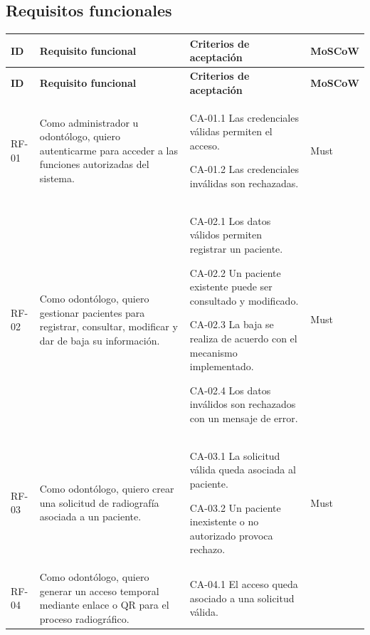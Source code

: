 
\subsection{Requisitos funcionales}

\begin{longtable}
	{|L{1.1cm}|L{3.5cm}|L{6.1cm}|L{1.6cm}|}
	
	\hline
	\textbf{ID} &
	\textbf{Requisito funcional} &
	\textbf{Criterios de aceptación} &
	\textbf{MoSCoW}
	\\ \hline
	
	\endfirsthead
	
	\hline
	\textbf{ID} &
	\textbf{Requisito funcional} &
	\textbf{Criterios de aceptación} &
	\textbf{MoSCoW}
	\\ \hline
	
	\endhead
	
	RF-01 &
	Como administrador u odontólogo, quiero autenticarme para acceder a las
	funciones autorizadas del sistema. &
	CA-01.1 Las credenciales válidas permiten el acceso.
	
	CA-01.2 Las credenciales inválidas son rechazadas. &
	Must
	\\ \hline
	
	RF-02 &
	Como odontólogo, quiero gestionar pacientes para registrar, consultar,
	modificar y dar de baja su información. &
	CA-02.1 Los datos válidos permiten registrar un paciente.
	
	CA-02.2 Un paciente existente puede ser consultado y modificado.
	
	CA-02.3 La baja se realiza de acuerdo con el mecanismo implementado.
	
	CA-02.4 Los datos inválidos son rechazados con un mensaje de error. &
	Must
	\\ \hline
	
	RF-03 &
	Como odontólogo, quiero crear una solicitud de radiografía asociada a un
	paciente. &
	CA-03.1 La solicitud válida queda asociada al paciente.
	
	CA-03.2 Un paciente inexistente o no autorizado provoca rechazo. &
	Must
	\\ \hline
	
	RF-04 &
	Como odontólogo, quiero generar un acceso temporal mediante enlace o QR
	para el proceso radiográfico. &
	CA-04.1 El acceso queda asociado a una solicitud válida.
	

\end{longtable}
